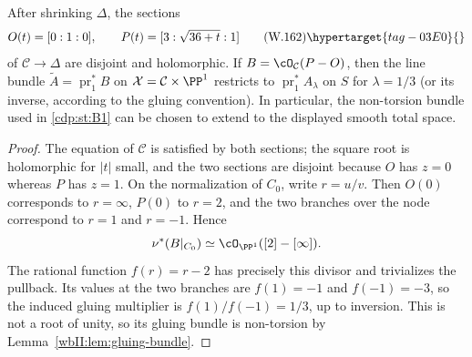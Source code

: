 \begin{lemma}
\hypertarget{tag-03I9}{}\label{wbII:lem:extending-gluing}

After shrinking $\Delta$, the sections
\[
 O(t)=[0:1:0],\qquad
 P(t)=[3:\sqrt{36+t}:1]
\tag{W.162}\hypertarget{tag-03E0}{}\label{wbII:eq:CN:4.5a}
\]
of $\mathcal C\to\Delta$ are disjoint and holomorphic.  If
$B=\cO_{\mathcal C}(P-O)$, then the line bundle
$\widetilde A=\operatorname{pr}_1^*B$ on $\mathcal X=\mathcal C\times\PP^1$
restricts to $\operatorname{pr}_1^*A_{\lambda}$ on $S$ for
$\lambda=1/3$ (or its inverse, according to the gluing convention).  In
particular, the non-torsion bundle used in \cref{cdp:st:B1} can
be chosen to extend to the displayed smooth total space.
\end{lemma}



\begin{proof}
The equation of $\mathcal C$ is satisfied by both sections; the square root
is holomorphic for $|t|$ small, and the two sections are disjoint because
$O$ has $z=0$ whereas $P$ has $z=1$.  On the normalization of $C_0$, write
$r=u/v$.  Then $O(0)$ corresponds to $r=\infty$, $P(0)$ to $r=2$, and the
two branches over the node correspond to $r=1$ and $r=-1$.  Hence
\[
 \nu^*(B|_{C_0})\simeq\cO_{\PP^1}([2]-[\infty]).
\]
The rational function $f(r)=r-2$ has precisely this divisor and trivializes
the pullback.  Its values at the two branches are $f(1)=-1$ and
$f(-1)=-3$, so the induced gluing multiplier is $f(1)/f(-1)=1/3$,
up to inversion.  This is not a root of unity, so its gluing bundle is non-torsion by
Lemma~\ref{wbII:lem:gluing-bundle}.

\end{proof}